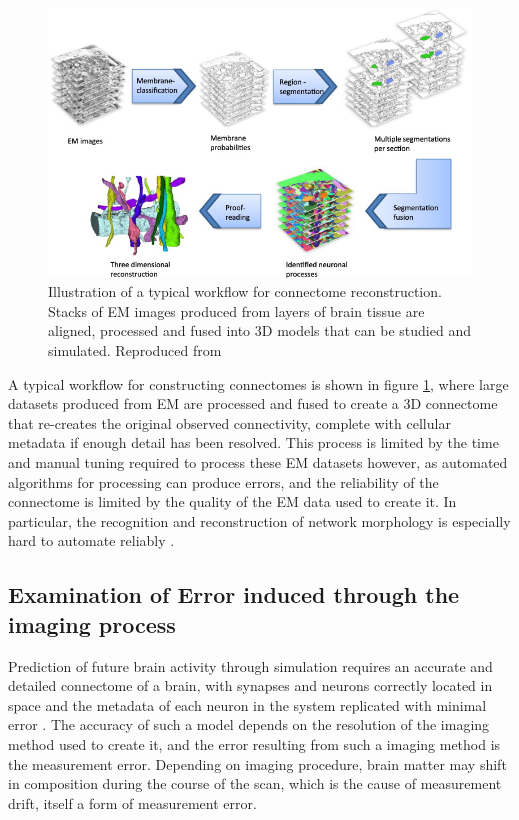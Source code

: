 \begin{figure}[h!]
    \centering
    \includegraphics[scale=0.9]{figures/images/reconstruction.jpg}
    \caption[Illustration of a typical workflow for connectome reconstruction]
        {Illustration of a typical workflow for connectome reconstruction.
        Stacks of EM images produced from layers of brain tissue are aligned,
        processed and fused into 3D models that can be studied and simulated.
        Reproduced from \cite{kaynig_large-scale_2015}}
    \label{reconstruction}
\end{figure}

A typical workflow for constructing
connectomes is shown in figure \ref{reconstruction}, where large datasets
produced from EM are processed and fused to create a 3D connectome that
re-creates the original observed connectivity, complete with cellular metadata
if enough detail has been resolved. This process is limited by the time and
manual tuning required to process these EM datasets however, as automated
algorithms for processing can produce errors, and the reliability of the
connectome is limited by the quality of the EM data used to create it. 
\autocite{pallotto_extracellular_2015} In
particular, the recognition and reconstruction of network morphology is
especially hard to automate reliably \autocite{helmstaedter_connectomic_2013}.

\subsection[Error induced through noise]{Examination of Error induced through the imaging process}

Prediction of future brain activity through simulation requires an accurate and
detailed connectome of a brain, with synapses and neurons correctly located in
space and the metadata of each neuron in the system replicated with minimal
error \autocite{bostrom_whole_2008}. The accuracy of such a model depends on the
resolution of the imaging method used to create it, and the error resulting from
such a imaging method is the measurement error. Depending on imaging procedure, brain matter may shift in composition during the course of the scan, which is the cause of measurement drift, itself a form of measurement error.

